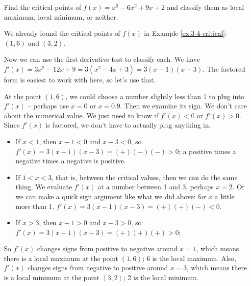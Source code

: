 \begin{example}
Find the critical points of $f(x)=x^3-6x^2+9x+2$ and classify them as local maximum, local minimum, or neither.

\begin{solution} We already found the critical points of $f(x)$ in Example \ref{ex:3-4-critical}: $(1, 6)$ and $(3, 2)$.

Now we can use the first derivative test to classify each. We have $f'(x)=3x^2-12x+9=3(x^2-4x+3)=3(x-1)(x-3)$. The factored form is easiest to work with here, so let's use that.

At the point $(1, 6)$, we could choose a number slightly less than 1 to plug into $f'(x)$ -- perhaps use $x=0$ or $x=0.9$. Then we examine its sign. We don't care about the numerical value. We just need to know if $f'(x)<0$ or $f'(x)>0$. Since $f'(x)$ is factored, we don't have to actually plug anything in.
    \begin{itemize}
    \item If $x<1$, then $x-1<0$ and $x-3<0$, so $f'(x)=3(x-1)(x-3) = (+)(-)(-) > 0$; a positive times a negative times a negative is positive.
    \item If $1<x<3$, that is, between the critical values, then we can do the same thing. We evaluate $f'(x)$ at a number between 1 and 3, perhaps $x=2$. Or we can make a quick sign argument like what we did above: for $x$ a little more than 1, $f'(x)=3(x-1)(x-3)=(+)(+)(-)<0$. 
    \item If $x>3$, then $x-1>0$ and $x-3>0$, so $f'(x)=3(x-1)(x-3) = (+)(+)(+) > 0$;
    \end{itemize}
So $f'(x)$ changes signs from positive to negative around $x=1$, which means there is a local maximum at the point $(1, 6)$; 6 is the local maximum. Also, $f'(x)$ changes signs from negative to positive around $x=3$, which means there is a local minimum at the point $(3, 2)$; 2 is the local minimum. 


\end{solution}
\end{example}
